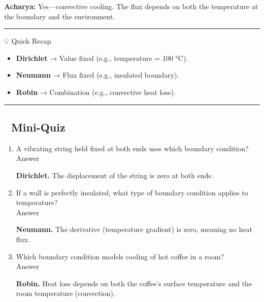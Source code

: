 \documentclass[
  letterpaper,
]{book}
\providecommand{\tightlist}{%
  \setlength{\itemsep}{0pt}\setlength{\parskip}{0pt}}
\begin{document}
\textbf{Acharya:} Yes---convective cooling. The flux depends on both the
temperature at the boundary and the environment.

\begin{center}\rule{0.5\linewidth}{0.5pt}\end{center}

💡 Quick Recap

\begin{itemize}
\tightlist
\item
  \textbf{Dirichlet} → Value fixed (e.g., temperature = 100 °C).\\
\item
  \textbf{Neumann} → Flux fixed (e.g., insulated boundary).\\
\item
  \textbf{Robin} → Combination (e.g., convective heat loss).
\end{itemize}

\begin{center}\rule{0.5\linewidth}{0.5pt}\end{center}

\subsection{📝 Mini-Quiz}\label{mini-quiz}

\begin{enumerate}
\def\labelenumi{\arabic{enumi}.}
\tightlist
\item
  A vibrating string held fixed at both ends uses which boundary
  condition?\\

  Answer

  \textbf{Dirichlet.} The displacement of the string is zero at both
  ends.
\item
  If a wall is perfectly insulated, what type of boundary condition
  applies to temperature?\\

  Answer

  \textbf{Neumann.} The derivative (temperature gradient) is zero,
  meaning no heat flux.
\item
  Which boundary condition models cooling of hot coffee in a room?\\

  Answer

  \textbf{Robin.} Heat loss depends on both the coffee's surface
  temperature and the room temperature (convection).
\end{enumerate}
\end{document}
